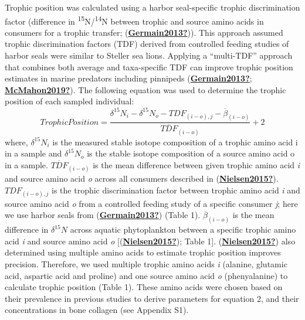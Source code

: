 \documentclass [11pt, proquest] {uwthesis}[2015/03/03]
\begin{document}
Trophic position was calculated using a harbor seal-specific trophic discrimination factor (difference in \textsuperscript{15}N/\textsuperscript{14}N between trophic and source amino acids in consumers for a trophic transfer; (\protect\hyperlink{ref-Germain2013}{\textbf{Germain2013?}})). This approach assumed trophic discrimination factors (TDF) derived from controlled feeding studies of harbor seals were similar to Steller sea lions. Applying a ``multi-TDF'' approach that combines both average and taxa-specific TDF can improve trophic position estimates in marine predators including pinnipeds (\protect\hyperlink{ref-Germain2013}{\textbf{Germain2013?}}; \protect\hyperlink{ref-McMahon2019}{\textbf{McMahon2019?}}). The following equation was used to determine the trophic position of each sampled individual:
\begin{equation} 
Trophic Position =   
  \frac{\delta^{15}N_i - \delta^{15}N_o - TDF_{(i-o),j} - \overline{\beta}_{(i-o)}}{\overline{TDF}_{(i-o)}}+2
  \label{eq:TP}
\end{equation}
where, \(\delta^{15}N_i\) is the measured stable isotope composition of a trophic amino acid i in a sample and \(\delta^{15}N_o\) is the stable isotope composition of a source amino acid o in a sample. \(\overline{TDF}_{(i-o)}\) is the mean difference between given trophic amino acid \emph{i} and source amino acid \emph{o} across all consumers described in (\protect\hyperlink{ref-Nielsen2015}{\textbf{Nielsen2015?}}). \(TDF_{(i-o), j}\) is the trophic discrimination factor between trophic amino acid \emph{i} and source amino acid \emph{o} from a controlled feeding study of a specific consumer \emph{j}; here we use harbor seals from (\protect\hyperlink{ref-Germain2013}{\textbf{Germain2013?}}) (Table 1). \(\overline\beta_{(i-o)}\) is the mean difference in \(\delta^{15}N\) across aquatic phytoplankton between a specific trophic amino acid \emph{i} and source amino acid \emph{o} {[}(\protect\hyperlink{ref-Nielsen2015}{\textbf{Nielsen2015?}}); Table 1{]}. (\protect\hyperlink{ref-Nielsen2015}{\textbf{Nielsen2015?}}) also determined using multiple amino acids to estimate trophic position improves precision. Therefore, we used multiple trophic amino acids \emph{i} (alanine, glutamic acid, aspartic acid and proline) and one source amino acid \emph{o} (phenyalanine) to calculate trophic position (Table 1). These amino acids were chosen based on their prevalence in previous studies to derive parameters for equation 2, and their concentrations in bone collagen (see Appendix S1).
\end{document}
